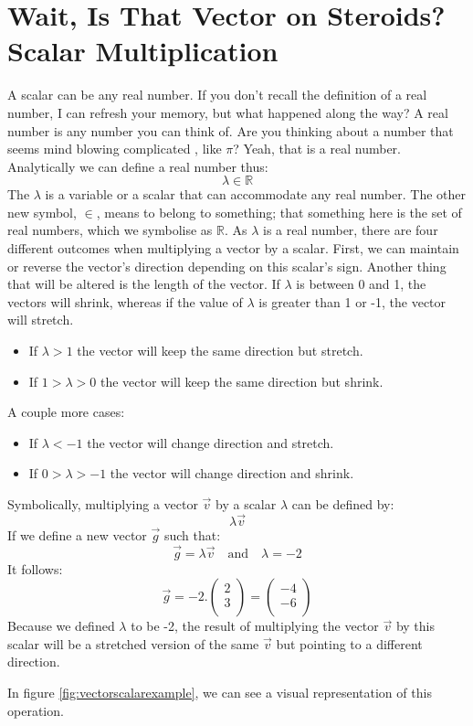 \documentclass[600paper, 11pt,twoside,openany]{kdp}
\begin{document}
\section{Wait, Is That Vector on Steroids? Scalar Multiplication}
\indent A scalar can be any real number. If you don’t recall the definition of a real number, I can refresh your memory, but what happened along the way? A real number is any number you can think of. Are you thinking about a number that seems mind blowing complicated , like $\pi$? Yeah, that is a real number. Analytically we can define a real number thus:
\[\lambda \in \mathbb{R}\]
\indent The $\lambda$ is a variable or a scalar that can accommodate any real number. The other new symbol, $\in$, means to belong to something; that something here is the set of real numbers, which we symbolise as $\mathbb{R}$. As $\lambda$ is a real number, there are four different outcomes when multiplying a vector by a scalar. First, we can maintain or reverse the vector's direction depending on this scalar's sign. Another thing that will be altered is the length of the vector. If $\lambda$ is between 0 and 1, the vectors will shrink, whereas if the value of $\lambda$ is greater than 1 or -1, the vector will stretch.
\begin{tcolorbox}
\begin{itemize}
\item If $\lambda >1 $ the vector will keep the same direction but stretch.
\item If $1 > \lambda > 0$ the vector will keep the same direction but shrink.
\end{itemize}
\end{tcolorbox}
\indent A couple more cases:
\begin{tcolorbox}
\begin{itemize}
\item If $\lambda < -1$ the vector will change direction and stretch.
\item If $0 > \lambda > -1$ the vector will change direction and shrink.
\end{itemize}
\end{tcolorbox}
\indent Symbolically, multiplying a vector $\overrightarrow{v}$ by a scalar $\lambda$ can be defined by:
 \[\lambda \overrightarrow{v}\]
\indent If we define a new vector $\overrightarrow{g}$ such that:
\[\overrightarrow{g} = \lambda \overrightarrow{v} \quad \textrm{and} \quad  \lambda = -2\]
\indent It follows:
\[\overrightarrow{g} = -2.\begin{pmatrix}
 2\\
 3\\
\end{pmatrix} = \begin{pmatrix}
 -4\\
 -6\\
\end{pmatrix}\]
\indent Because we defined $\lambda$ to be -2, the result of multiplying the vector $\overrightarrow{v}$ by this scalar will be a stretched version of the same $\overrightarrow{v}$ but pointing to a different direction. 
\par 
\vspace{-3pt}
\indent In figure \ref{fig:vectorscalarexample}, we can see a visual representation of this operation.
\end{document}
